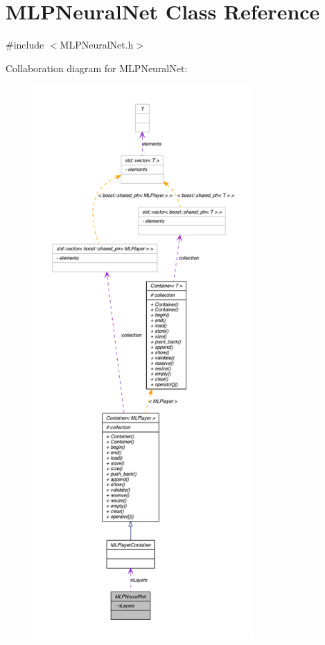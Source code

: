 \hypertarget{class_m_l_p_neural_net}{
\section{MLPNeuralNet Class Reference}
\label{class_m_l_p_neural_net}
}


{\ttfamily \#include $<$MLPNeuralNet.h$>$}



Collaboration diagram for MLPNeuralNet:
\nopagebreak
\begin{figure}[H]
\begin{center}
\leavevmode
\includegraphics[height=600pt]{class_m_l_p_neural_net__coll__graph}
\end{center}
\end{figure}
